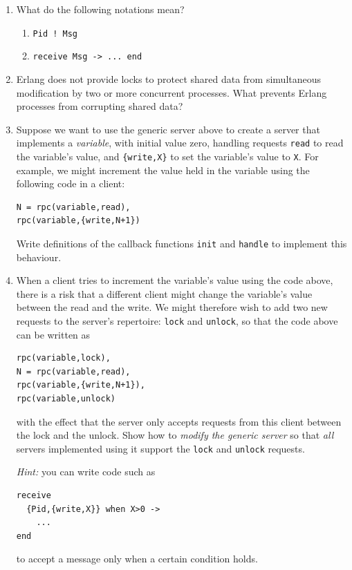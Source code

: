 \documentclass{article}
\begin{document}
\begin{enumerate}

\item
What do the following notations mean?
\begin{enumerate}
\item \verb,Pid ! Msg,
\item \verb!receive Msg -> ... end!
\end{enumerate}

\item 
Erlang does not provide locks to protect shared data from simultaneous
modification by two or more concurrent processes. What prevents Erlang
processes from corrupting shared data?

\item
Suppose we want to use the generic server above to create a server
that implements a {\em variable}, with initial value zero, handling
requests \verb!read! to read the variable's value, and
\verb!{write,X}! to set the variable's value to \verb!X!. For example,
we might increment the value held in the variable using the following
code in a client:
\begin{verbatim}
N = rpc(variable,read),
rpc(variable,{write,N+1})
\end{verbatim}
Write definitions of the callback functions \verb!init! and
\verb!handle! to implement this behaviour.

\item
When a client tries to increment the variable's value using the code
above, there is a risk that a different client might change the
variable's value between the read and the write. We might therefore
wish to add two new requests to the server's repertoire: \verb!lock!
  and \verb!unlock!, so that the code above can be written as
\begin{verbatim}
rpc(variable,lock),
N = rpc(variable,read),
rpc(variable,{write,N+1}),
rpc(variable,unlock)
\end{verbatim}
with the effect that the server only accepts requests from this client
between the lock and the unlock. Show how to {\em modify the generic
  server} so that {\em all} servers implemented using it support the
\verb!lock! and \verb!unlock! requests.

{\em Hint:} you can write code such as
\begin{verbatim}
receive 
  {Pid,{write,X}} when X>0 -> 
    ... 
end
\end{verbatim}
to accept a message only when a certain condition holds.


\end{enumerate}
\end{document}
